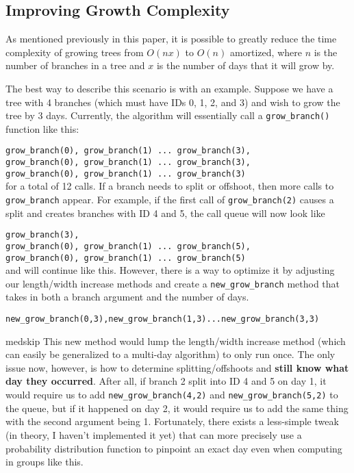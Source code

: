 \subsection{Improving Growth Complexity}

As mentioned previously in this paper, it is possible to greatly reduce the time complexity of growing trees from $O(nx)$ to $O(n)$ amortized, where $n$ is the number of branches in a tree and $x$ is the number of days that it will grow by.

The best way to describe this scenario is with an example. Suppose we have a tree with 4 branches (which must have IDs 0, 1, 2, and 3) and wish to grow the tree by 3 days. Currently, the algorithm will essentially call a \verb|grow_branch()| function like this:

\centering
\verb|grow_branch(0), grow_branch(1) ... grow_branch(3),|\\
\verb|grow_branch(0), grow_branch(1) ... grow_branch(3),|\\
\verb|grow_branch(0), grow_branch(1) ... grow_branch(3)|\\

\medskip\justifying
\setlength{\parindent}{0pt}
\setlength{\parskip}{8pt} for a total of 12 calls. If a branch needs to split or offshoot, then more calls to \verb|grow_branch| appear. For example, if the first call of \verb|grow_branch(2)| causes a split and creates branches with ID 4 and 5, the call queue will now look like

\centering
\verb|grow_branch(3),|\\
\verb|grow_branch(0), grow_branch(1) ... grow_branch(5),|\\
\verb|grow_branch(0), grow_branch(1) ... grow_branch(5)|\\

\medskip\justifying
\setlength{\parindent}{0pt}
\setlength{\parskip}{8pt} and will continue like this. However, there is a way to optimize it by adjusting our length/width increase methods and create a \verb|new_grow_branch| method that takes in both a branch argument and the number of days.

\centering
\verb|new_grow_branch(0,3),new_grow_branch(1,3)...new_grow_branch(3,3)|

medskip\justifying
\setlength{\parindent}{0pt}
\setlength{\parskip}{8pt} This new method would lump the length/width increase method (which can easily be generalized to a multi-day algorithm) to only run once. The only issue now, however, is how to determine splitting/offshoots and \textbf{still know what day they occurred}. After all, if branch 2 split into ID 4 and 5 on day 1, it would require us to add \verb|new_grow_branch(4,2)| and \verb|new_grow_branch(5,2)| to the queue, but if it happened on day 2, it would require us to add the same thing with the second argument being 1. Fortunately, there exists a less-simple tweak (in theory, I haven't implemented it yet) that can more precisely use a probability distribution function to pinpoint an exact day even when computing in groups like this.

